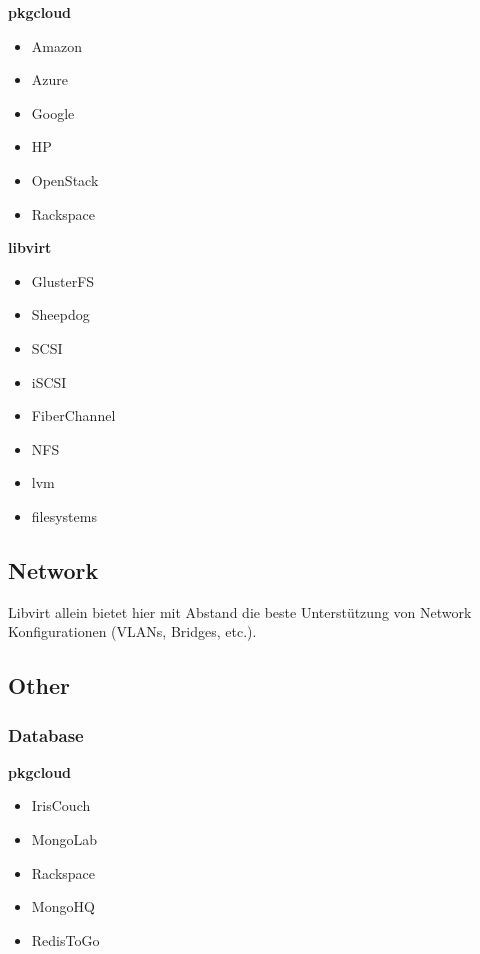 \textbf{pkgcloud}
\begin{multicols}{2}
\begin{itemize}
\item Amazon
\item Azure
\item Google
\item HP
\item OpenStack
\item Rackspace
\end{itemize}
\end{multicols}

\textbf{libvirt}
\begin{multicols}{2}
\begin{itemize}
  \item GlusterFS
  \item Sheepdog
  \item SCSI
  \item iSCSI
  \item FiberChannel
  \item NFS
  \item lvm
  \item filesystems
\end{itemize}
\end{multicols}

\subsection{Network}
Libvirt allein bietet hier mit Abstand die beste Unterstützung von Network Konfigurationen 
(VLANs, Bridges, etc.).\\


\subsection{Other}
\subsubsection{Database}
\textbf{pkgcloud}
\begin{multicols}{2}
\begin{itemize}
\item IrisCouch
\item MongoLab
\item Rackspace
\item MongoHQ
\item RedisToGo
\end{itemize}
\end{multicols}

